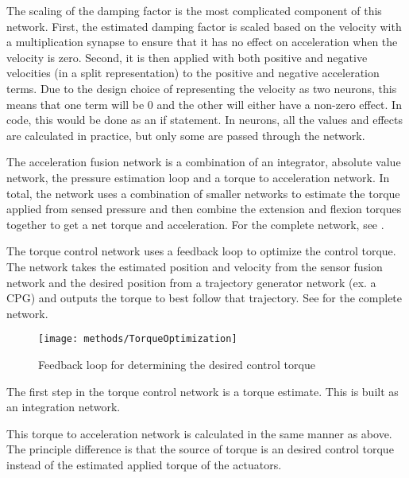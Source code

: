 The scaling of the damping factor is the most complicated component of this
network. First, the estimated damping factor is scaled based on the velocity 
with a multiplication synapse to ensure that it has no effect on acceleration
when the velocity is zero. Second, it is then applied with both positive and
negative velocities (in a split representation) to the positive and negative
acceleration terms. Due to the design choice of representing the velocity as two
neurons, this means that one term will be 0 and the other will either have a 
non-zero effect. In code, this would be done as an if statement. In neurons,
all the values and effects are calculated in practice, but only some are passed
through the network.


The acceleration fusion network is a combination of an integrator, absolute
value network, the pressure estimation loop and a torque to acceleration
network. In total, the network uses a combination of smaller networks to
estimate the torque applied from sensed pressure and then combine the extension
and flexion torques together to get a net torque and acceleration. For the complete network, see .


The torque control network uses a feedback loop to optimize the
control torque. The network takes the estimated position and velocity from the 
sensor fusion network and the desired position from a trajectory generator
network (ex. a CPG) and outputs the torque to best follow that trajectory.
See  for the complete network.

\begin{figure}
\centering
\texttt{[image: methods/TorqueOptimization]}
\caption{Feedback loop for determining the desired control torque}
\label{fig:TorqueOptimizationNetwork}
\end{figure}



The first step in the torque control network is a torque estimate. This is built
as an integration network.


This torque to acceleration network is calculated in the same manner as above.
The principle difference is that the source of torque is an desired control
torque instead of the estimated applied torque of the actuators.

